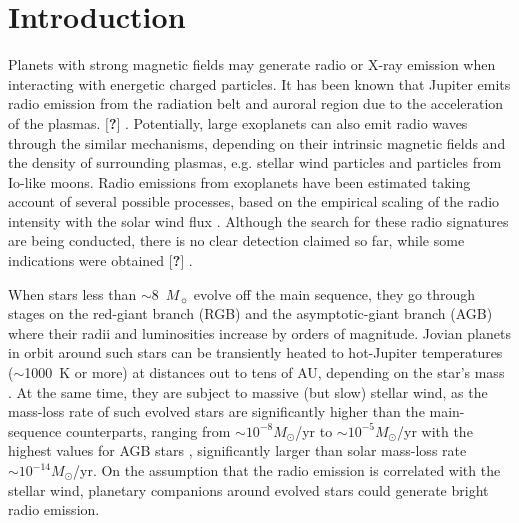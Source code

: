 \documentclass{emulateapj}
\def\memoYF#1{\color{red}$[${\bf #1}$]$ \color{black}}
\begin{document}


\section{Introduction}
\label{sec:intro}



Planets with strong magnetic fields may generate radio or X-ray emission when interacting with energetic charged particles. 
It has been known that Jupiter emits radio emission from the radiation belt and auroral region due to the acceleration of the plasmas. \memoYF{?}. Potentially, large exoplanets can also emit radio waves through the similar mechanisms, depending on their intrinsic magnetic fields and the density of surrounding plasmas, e.g. stellar wind particles and particles from Io-like moons. 
Radio emissions from exoplanets have been estimated taking account of several possible processes, based on the empirical scaling of the radio intensity with the solar wind flux \citep{zarka2001,griebmeier2007,noyola2014}. 
Although the search for these radio signatures are being conducted, there is no clear detection claimed so far, while some indications were obtained \memoYF{?} \citep{lecavelier_et_al2013}. 


When stars less than $\sim$8~$M_\sun$ evolve off the main sequence,
they go through stages on the red-giant branch (RGB) and the
asymptotic-giant branch (AGB) where their radii and luminosities increase by orders of magnitude. 
Jovian planets in orbit around such stars can be transiently heated to hot-Jupiter temperatures ($\sim$1000~K or more) at distances out to tens of AU, depending on the star's mass \citep{spiegel+madhusudhan2012}. 
At the same time, they are subject to massive (but slow) stellar wind, as the mass-loss rate of such evolved stars are significantly higher than the main-sequence counterparts, ranging from $\sim  10^{-8} M_{\odot }$/yr to $\sim  10^{-5} M_{\odot }$/yr with the highest values for AGB stars \citep[e.g.,][]{reimers1975,schild1989,vassiliadis1993,schoier2001,vanloon2005}, significantly larger than solar mass-loss rate $\sim 10^{-14}M_{\odot }$/yr. 
On the assumption that the radio emission is correlated with the stellar wind, planetary companions around evolved stars could generate bright radio emission. 
\end{document}
